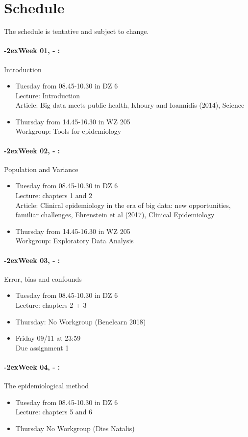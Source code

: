 \documentclass[11pt]{article}
\newcommand{\week}[1]{%
  \paragraph*{\kern-2ex\quad #1, \syldate{\today} - \AdvanceDate[4]\syldate{\today}:}%
  \ifdim\wd1=\wd\MONDAY
    \AdvanceDate[7]
  \else
    \AdvanceDate[7]
  \fi%
}
\begin{document}

\newpage
\section*{Schedule}


The schedule is tentative and subject to change. 

\SetDate[15/10/2018]
\week{Week 01} Introduction
\begin{itemize}
\item Tuesday from 08.45-10.30 in DZ 6 \\
Lecture: Introduction \\
Article: Big data meets public health, Khoury and Ioannidis (2014), Science
\item Thursday from 14.45-16.30 in WZ 205 \\
Workgroup: Tools for epidemiology 
\end{itemize}

\week{Week 02} Population and Variance 
\begin{itemize}
\item Tuesday from 08.45-10.30 in DZ 6 \\
Lecture: chapters 1 and 2 \\
Article: Clinical epidemiology in the era of big data: new
opportunities, familiar challenges, Ehrenstein et al (2017), Clinical Epidemiology
\item Thursday from 14.45-16.30 in WZ 205 \\
Workgroup: Exploratory Data Analysis 
\end{itemize}

\week{Week 03} Error, bias and confounds
\begin{itemize}
\item Tuesday from 08.45-10.30 in DZ 6 \\
Lecture: chapters 2 + 3 
\item  Thursday: No Workgroup (Benelearn 2018)
\item Friday 09/11 at 23:59\\
Due assignment 1 
\end{itemize}

\week{Week 04} The epidemiological method
\begin{itemize}
\item Tuesday from 08.45-10.30 in DZ 6 \\
Lecture: chapters 5 and 6  
\item Thursday No Workgroup (Dies Natalis)
\end{itemize}
\end{document}
